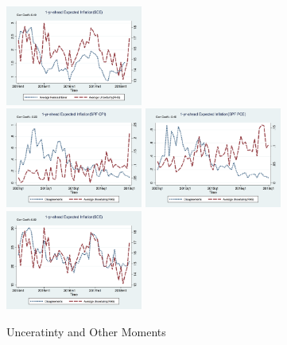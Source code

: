 \documentclass[]{article}
\begin{document}
\begin{figure}[ht]
		\includegraphics[width=4.5cm]{figures/SCE_FE_varSCEM.png}\\
	\smallskip	
	\includegraphics[width=4.5cm]{figures/CPI_disg_varSPFCPIQ.png}
	\includegraphics[width=4.5cm]{figures/PCE_disg_varSPFPCEQ.png}
	\includegraphics[width=4.5cm]{figures/Q9_disg_varSCEM.png}\\
		\caption{Unceratinty and Other Moments}
		\label{UnceratitnyOtherMoments}
\end{figure}
\end{document}
